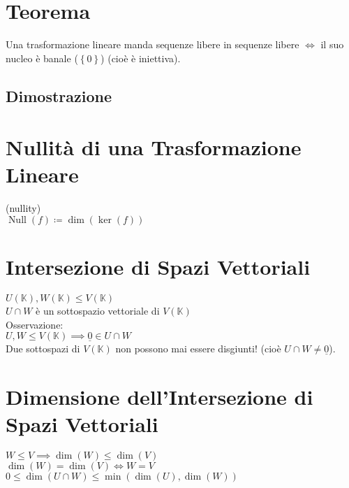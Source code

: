 \documentclass[a4paper, twoside, italian, 11pt]{book}
\newcommand{\braces}[1] {\left \{ #1 \right \}}
\DeclareMathOperator{\Null}{Null}
\newcommand{\K}{\mathbb K}
\begin{document}
\section{Teorema}

Una trasformazione lineare manda sequenze libere in sequenze libere $\iff$ il suo nucleo è banale ($\braces{0}$) (cioè è iniettiva).


\subsection{Dimostrazione}




\section{Nullità di una Trasformazione Lineare}

(nullity) \\

\noindent
$\Null(f) \coloneqq \dim(\ker(f))$



\section{Intersezione di Spazi Vettoriali}

$U(\K), W(\K) \leq V(\K)$ \\

\noindent
$U \cap W$ è un sottospazio vettoriale di $V(\K)$ \\

\noindent
Osservazione: \\

\noindent
$U, W \leq V(\K) \implies \underline 0 \in U \cap W$ \\
Due sottospazi di $V(\K)$ non possono mai essere disgiunti! (cioè $U \cap W \neq \underline 0$).



\section{Dimensione dell'Intersezione di Spazi Vettoriali}

$W \leq V \implies \dim(W) \leq \dim(V)$ \\
$\dim(W) = \dim(V) \iff W = V$ \\

\noindent
$0 \leq \dim(U \cap W) \leq \min(\dim(U), \dim(W))$
\end{document}
